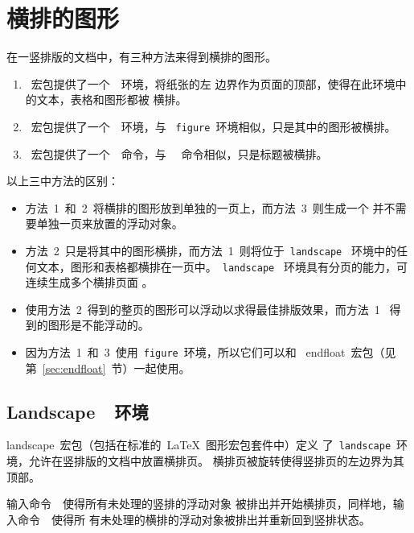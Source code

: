 \section{横排的图形}

\noindent 在一竖排版的文档中，有三种方法来得到横排的图形。
\begin{enumerate}
	\item {}~宏包提供了一个~~环境，将纸张的左
	边界作为页面的顶部，使得在此环境中的文本，表格和图形都被
	横排。
	\item {}~宏包提供了一个~~环境，与
	~\texttt{figure}~环境相似，只是其中的图形被横排。
	\item {}~宏包提供了一个~~命令，与
	~~命令相似，只是标题被横排。
\end{enumerate}

\noindent 以上三中方法的区别：
\begin{itemize}
	\item 方法~1~和~2~将横排的图形放到单独的一页上，而方法~3~则生成一个
	并不需要单独一页来放置的浮动对象。
	\item 方法~2~只是将其中的图形横排，而方法~1~则将位于~\texttt{landscape}~
	环境中的任何文本，图形和表格都横排在一页中。~\texttt{landscape}~
	环境具有分页的能力，可连续生成多个横排页面
	。
	\item 使用方法~2~得到的整页的图形可以浮动以求得最佳排版效果，而方法~1~
	得到的图形是不能浮动的。
	\item 因为方法~1~和~3~使用~\texttt{figure}~环境，所以它们可以和
	~\textsf{endfloat}~宏包（见第~\ref{sec:endfloat}~节）一起使用。
\end{itemize}

\subsection{Landscape~~环境}\label{ssec:landscape}

\textsf{landscape}~宏包（包括在标准的~\LaTeX{}~图形宏包套件中）定义
了~\texttt{landscape}~环境，允许在竖排版的文档中放置横排页。
横排页被旋转使得竖排页的左边界为其顶部。

输入命令~~使得所有未处理的竖排的浮动对象
被排出并开始横排页，同样地，输入命令~~使得所
有未处理的横排的浮动对象被排出并重新回到竖排状态。

